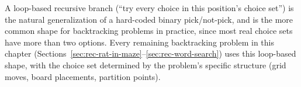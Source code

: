 \begin{takeawaybox}
A loop-based recursive branch (``try every choice in this position's
choice set'') is the natural generalization of a hard-coded binary
pick/not-pick, and is the more common shape for backtracking problems in
practice, since most real choice sets have more than two options. Every
remaining backtracking problem in this chapter
(Sections~\ref{sec:rec-rat-in-maze}--\ref{sec:rec-word-search}) uses this
loop-based shape, with the choice set determined by the problem's
specific structure (grid moves, board placements, partition points).
\end{takeawaybox}
